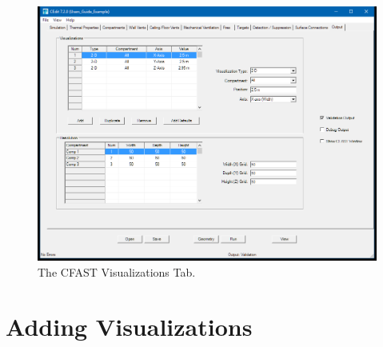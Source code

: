 \begin{figure}[h!]
\begin{center}
\includegraphics[width=6.5in]{FIGURES/Visualizations_Tab}
\caption[The CFAST Visualizations Tab]{The CFAST Visualizations Tab.}
\end{center}
\end{figure}

\section{Adding Visualizations}
\label{info:ISOF}
\label{info:SLCF}

